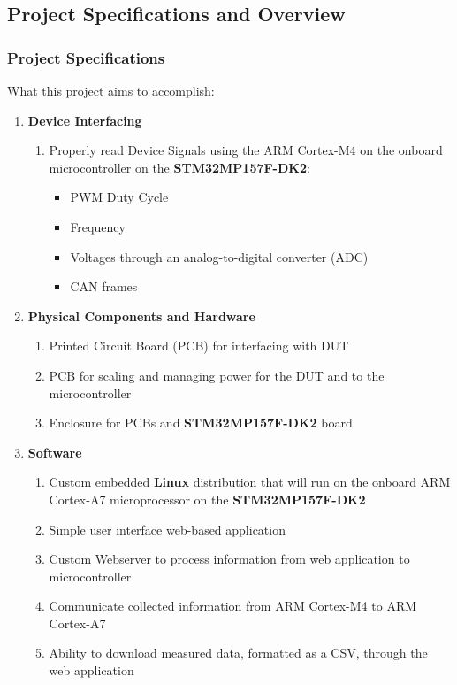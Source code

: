 \documentclass[8pt,compress]{beamer}
\newcommand\LightBold[1]{\textcolor{VSBlueLight}{\textbf{#1}}}
\newcommand\DarkBold[1]{\textcolor{VSBlueDark}{\textbf{#1}}}
\begin{document}
\subsection{Project Specifications and Overview}
\begin{frame}
  \frametitle{Project Specifications}
  \small
  \begin{block}{What this project aims to accomplish:}
    \begin{enumerate}
      \item {\DarkBold{Device Interfacing}}
        \begin{enumerate}
          \item Properly read Device Signals using the ARM Cortex-M4 on the onboard microcontroller on the 
            \LightBold{STM32MP157F-DK2}:
            \begin{itemize}
              \item PWM Duty Cycle 
              \item Frequency
              \item Voltages through an analog-to-digital converter (ADC)
              \item CAN frames
            \end{itemize}
        \end{enumerate}
      \item {\DarkBold{Physical Components and Hardware}}
        \begin{enumerate}
          \item Printed Circuit Board (PCB) for interfacing with DUT
          \item PCB for scaling and managing power for the DUT and to the microcontroller
          \item Enclosure for PCBs and \LightBold{STM32MP157F-DK2} board
        \end{enumerate}
      \item {\DarkBold{Software}}
        \begin{enumerate}
          \item Custom embedded \textbf{Linux} distribution that will run on the onboard ARM Cortex-A7
            microprocessor on the \LightBold{STM32MP157F-DK2}
          \item Simple user interface web-based application
          \item Custom Webserver to process information from web application to microcontroller
          \item Communicate collected information from ARM Cortex-M4 to ARM Cortex-A7
          \item Ability to download measured data, formatted as a CSV, through the web application 
        \end{enumerate}
    \end{enumerate}
  \end{block}
\end{frame}
\end{document}
